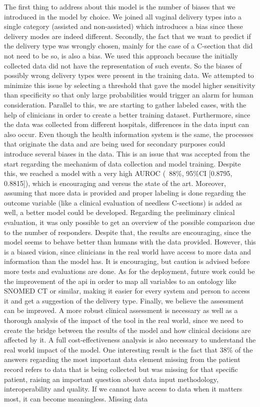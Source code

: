 
The first thing to address about this model is the number of biases that we introduced in the model by choice. We joined all vaginal delivery types into a single category (assisted and non-assisted) which introduces a bias since these delivery modes are indeed different. Secondly, the fact that we want to predict if the delivery type was wrongly chosen, mainly for the case of a C-section that did not need to be so, is also a bias. We used this approach because the initially collected data did not have the representation of such events. So the biases of possibly wrong delivery types were present in the training data. We attempted to minimize this issue by selecting a threshold that gave the model higher sensitivity than specificity so that only large probabilities would trigger an alarm for human consideration. Parallel to this, we are starting to gather labeled cases, with the help of clinicians in order to create a better training dataset. Furthermore, since the data was collected from different hospitals, differences in the data input can also occur. Even though the health information system is the same, the processes that originate the data and are being used for secondary purposes could introduce several biases in the data. This is an issue that was accepted from the start regarding the mechanism of data collection and model training. Despite this, we reached a model with a very high AUROC (~88\%, 95\%CI [0.8795, 0.8815]), which is encouraging and versus the state of the art. Moreover, assuming that more data is provided and proper labeling is done regarding the outcome variable (like a clinical evaluation of needless C-sections) is added as well, a better model could be developed. Regarding the preliminary clinical evaluation, it was only possible to get an overview of the possible comparison due to the number of responders. Despite that, the results are encouraging, since the model seems to behave better than humans with the data provided. However, this is a biased vision, since clinicians in the real world have access to more data and information than the model has. It is encouraging, but caution is advised before more tests and evaluations are done. As for the deployment, future work could be the improvement of the \ac{api} in order to map all variables to an ontology like SNOMED CT or similar, making it easier for every system and person to access it and get a suggestion of the delivery type. Finally, we believe the assessment can be improved. A more robust clinical assessment is necessary as well as a thorough analysis of the impact of the tool in the real world, since we need to create the bridge between the results of the model and how clinical decisions are affected by it. A full cost-effectiveness analysis is also necessary to understand the real world impact of the model. One interesting result is the fact that 38\% of the answers regarding the most important data element missing from the patient record refers to data that is being collected but was missing for that specific patient, raising an important question about data input methodology, interoperability and quality. If we cannot have access to data when it matters most, it can become meaningless. Missing data 